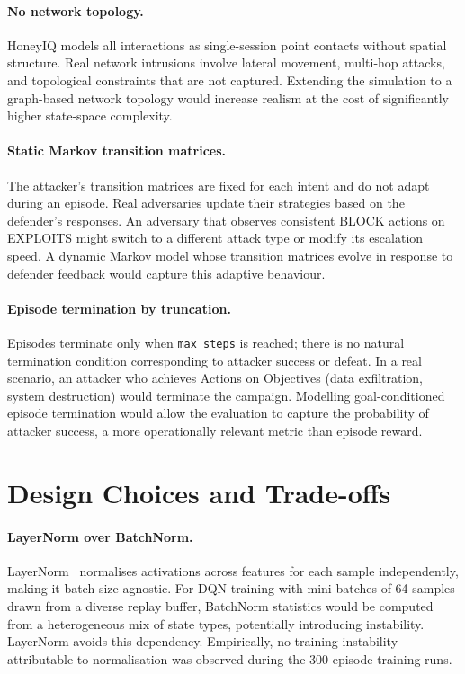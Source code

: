\paragraph{No network topology.}
HoneyIQ models all interactions as single-session point contacts without
spatial structure.
Real network intrusions involve lateral movement, multi-hop attacks, and
topological constraints that are not captured.
Extending the simulation to a graph-based network topology would increase
realism at the cost of significantly higher state-space complexity.

\paragraph{Static Markov transition matrices.}
The attacker's transition matrices are fixed for each intent and do not
adapt during an episode.
Real adversaries update their strategies based on the defender's responses.
An adversary that observes consistent BLOCK actions on EXPLOITS might switch
to a different attack type or modify its escalation speed.
A dynamic Markov model whose transition matrices evolve in response to
defender feedback would capture this adaptive behaviour.

\paragraph{Episode termination by truncation.}
Episodes terminate only when \texttt{max\_steps} is reached; there is no
natural termination condition corresponding to attacker success or defeat.
In a real scenario, an attacker who achieves Actions on Objectives (data
exfiltration, system destruction) would terminate the campaign.
Modelling goal-conditioned episode termination would allow the evaluation
to capture the probability of attacker success, a more operationally
relevant metric than episode reward.

\section{Design Choices and Trade-offs}
\label{sec:disc_design}

\paragraph{LayerNorm over BatchNorm.}
LayerNorm~\citep{ba2016layer} normalises activations across features for
each sample independently, making it batch-size-agnostic.
For DQN training with mini-batches of 64 samples drawn from a diverse
replay buffer, BatchNorm statistics would be computed from a
heterogeneous mix of state types, potentially introducing instability.
LayerNorm avoids this dependency.
Empirically, no training instability attributable to normalisation was
observed during the 300-episode training runs.

